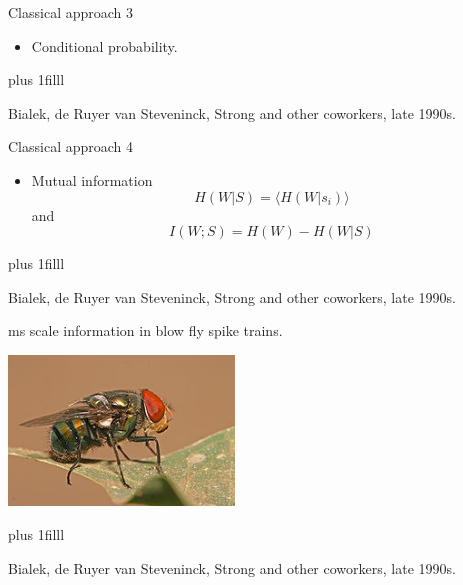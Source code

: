\documentclass{beamer}
\newcommand{\btVFill}{\vskip0pt plus 1filll}
\begin{document}
\begin{frame}{Classical approach 3}
\begin{itemize}
\item Conditional probability.
\color{reddish}
\begin{center}

\end{center}
\color{black}
\end{itemize}
\btVFill
\begin{flushright}
\tiny{Bialek, de Ruyer van Steveninck, Strong and other coworkers, late 1990s.}
\end{flushright}
\end{frame}


\begin{frame}{Classical approach 4}
\begin{itemize}
\item Mutual information
\color{dark}
$$H(W|S)=\langle H(W|s_i)\rangle$$
\color{black}
and
\color{dark}
$$I(W;S)=H(W)-H(W|S)$$
\color{black}
\end{itemize}
\btVFill
\begin{flushright}
\color{gray}
  \tiny{Bialek, de Ruyer van Steveninck, Strong and other coworkers, late 1990s.}
\end{flushright}
\color{black}
\end{frame}


\begin{frame}{ms scale information in blow fly spike trains.}
\begin{center}
\includegraphics[width=6cm]{blow_fly.jpg}
\end{center}
\btVFill
\begin{flushright}
  \color{gray}
\tiny{Bialek, de Ruyer van Steveninck, Strong and other coworkers, late 1990s.}
\color{black}
\end{flushright}
\end{frame}
\end{document}
